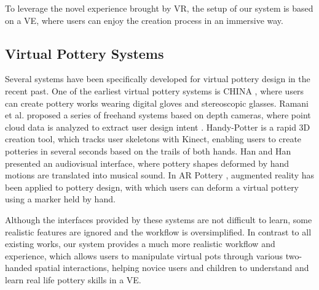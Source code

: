 \documentclass{svjour3}                     %
\begin{document}
To leverage the novel experience brought by VR, the setup of our system is based on a VE, where users can enjoy the creation process in an immersive way.

\subsection{Virtual Pottery Systems}
\label{sec:2.3}


Several systems have been specifically developed for virtual pottery design in the recent past.
One of the earliest virtual pottery systems is CHINA \cite{korida1997interactive}, where users can create pottery works wearing digital gloves and stereoscopic glasses.
Ramani et al. proposed a series of freehand systems based on depth cameras, where point cloud data is analyzed to extract user design intent \cite{ramani2014zpots,ramani2015gesture,ramani2016extracting}.
Handy-Potter \cite{murugappan2013handy} is a rapid 3D creation tool, which tracks user skeletons with Kinect, enabling users to create potteries in several seconds based on the trails of both hands.
Han and Han \cite{han2014virtual} presented an audiovisual interface, where pottery shapes deformed by hand motions are translated into musical sound.
In AR Pottery \cite{han2007ar}, augmented reality has been applied to pottery design, with which users can deform a virtual pottery using a marker held by hand.

Although the interfaces provided by these systems are not difficult to learn, some realistic features are ignored and the workflow is oversimplified.
In contrast to all existing works, our system provides a much more realistic workflow and experience, which allows users to manipulate virtual pots through various two-handed spatial interactions, helping novice users and children to understand and learn real life pottery skills in a VE.
\end{document}
